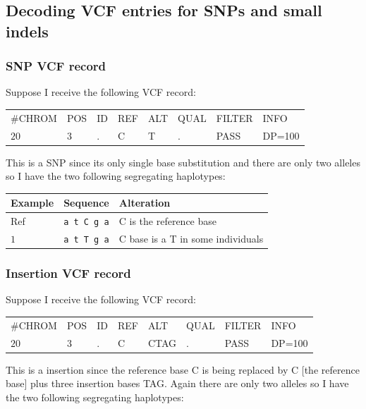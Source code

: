 \documentclass[8pt]{article}
\begin{document}
\subsection{Decoding VCF entries for SNPs and small indels}
\subsubsection{SNP VCF record}
Suppose I receive the following VCF record:

\vspace{0.3cm}
\begin{tabular}{ l l l l l l l l}
	\#CHROM & POS & ID & REF & ALT & QUAL & FILTER & INFO \\
	$20$ & $3$ & . & C & T & . & PASS & DP=100 \\
\end{tabular}
\vspace{0.3cm}

This is a SNP since its only single base substitution and there are only two alleles so I have the two following segregating haplotypes:

\vspace{0.3cm}
\begin{tabular}{ | l | l | l | }
\hline
Example & Sequence & Alteration \\ \hline
Ref & \verb|a t C g a| & C is the reference base \\ \hline
$1$ & \verb|a t T g a| & C base is a T in some individuals \\ \hline
\end{tabular}

\subsubsection{Insertion VCF record}
Suppose I receive the following VCF record:

\vspace{0.3cm}
\begin{tabular}{ l l l l l l l l}
	\#CHROM & POS & ID & REF & ALT & QUAL & FILTER & INFO \\
	$20$ & $3$ & . & C & CTAG & . & PASS & DP=100 \\
\end{tabular}
\vspace{0.3cm}

This is a insertion since the reference base C is being replaced by C [the reference base] plus three insertion bases TAG.
Again there are only two alleles so I have the two following segregating haplotypes:
\end{document}
